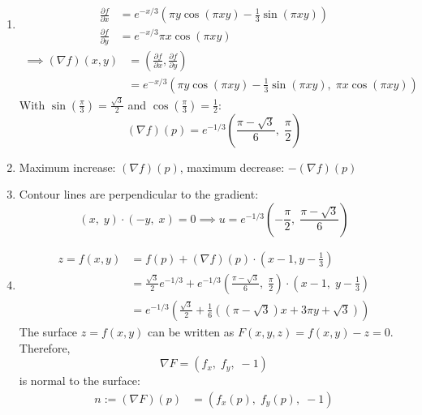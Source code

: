 \begin{solution}
	\begin{enumerate}
		\item
		      $$
			      \begin{aligned}
				      \frac{\partial f}{\partial x} & = e^{-x/3} \left( \pi y \cos(\pi xy) - \frac{1}{3} \sin(\pi xy) \right) \\
				      \frac{\partial f}{\partial y} & = e^{-x/3} \pi x \cos(\pi xy)
			      \end{aligned}
		      $$
		      $$
			      \begin{aligned}
				      \implies (\nabla f)(x,y) & = \left( \frac{\partial f}{\partial x}, \frac{\partial f}{\partial y} \right)                  \\
				                               & = e^{-x/3} \left( \pi y \cos(\pi xy) - \frac{1}{3} \sin(\pi xy), \; \pi x \cos(\pi xy) \right)
			      \end{aligned}
		      $$
		      With $\sin(\frac{\pi}{3}) = \frac{\sqrt{3}}{2}$ and $\cos(\frac{\pi}{3}) = \frac{1}{2}$:
		      $$
			      (\nabla f)(p) = e^{-1/3} \left( \frac{\pi - \sqrt{3}}{6}, \; \frac{\pi}{2} \right)
		      $$
		\item
		      Maximum increase: $(\nabla f)(p)$, maximum decrease: $-(\nabla f)(p)$
		\item
		      Contour lines are perpendicular to the gradient:
		      $$
			      (x, \; y) \cdot (-y, \; x) = 0 \implies u = e^{-1/3} \left( - \frac{\pi}{2}, \; \frac{\pi - \sqrt{3}}{6} \right)
		      $$
		\item
		      $$
			      \begin{aligned}
				      z = f(x, y) & = f(p) + (\nabla f)(p) \cdot (x - 1, y - \frac{1}{3})                                                                                \\
				                  & = \frac{\sqrt{3}}{2} e^{-1/3} + e^{-1/3} \left( \frac{\pi - \sqrt{3}}{6}, \; \frac{\pi}{2} \right) \cdot (x - 1, \; y - \frac{1}{3}) \\
				                  & = e^{-1/3} \left( \frac{\sqrt{3}}{2} + \frac{1}{6} \left( (\pi - \sqrt{3}) x + 3 \pi y + \sqrt{3} \right) \right)
			      \end{aligned}
		      $$
		      The surface $z = f(x, y)$ can be written as $F(x, y, z) = f(x, y) - z = 0$. Therefore,
		      $$
			      \nabla F = (f_x, \; f_y, \; -1)
		      $$
		      is normal to the surface:
		      $$
			      \begin{aligned}
				      n := (\nabla F)(p) & = \left( f_x(p), \; f_y(p), \; -1\right)                                            \\

\end{aligned}$$
\end{enumerate}
\end{solution}
